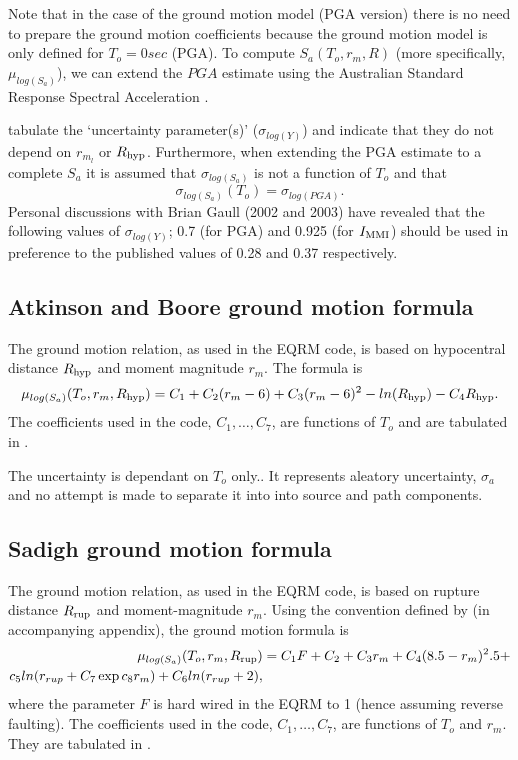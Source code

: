 Note that in the case of the \citet{dr_Gaull90a} ground motion model
(PGA version) there is no need to prepare the ground motion
coefficients because the ground motion model is only defined for
$T_o=0 sec$ (PGA). To compute $S_a(T_o,r_m,R)$ (more specifically,
$\mu_{log(S_a)}$), we can extend the $PGA$ estimate using the
Australian Standard Response Spectral Acceleration
\citep{dr_Standards93a}. 

\citet[Table 4]{dr_Gaull90a} tabulate the `uncertainty
parameter(s)' ($\sigma_{log(Y)}$) and indicate that they do not
depend on $r_{m_l}$ or $\Rhyp$. Furthermore, when extending the
PGA estimate to a complete $S_a$ it is assumed that
$\sigma_{log(S_a)}$ is not a function of $T_o$ and that
\begin{equation}
\sigma_{log(S_a)}(T_o) = \sigma_{log(PGA)}.
\end{equation}
Personal discussions with Brian Gaull (2002 and 2003) have
revealed that the following values of $\sigma_{log(Y)}$; 0.7 (for
PGA) and 0.925 (for $\Imm$) should be used in preference to the
published values of 0.28 and 0.37 respectively.


\subsection{Atkinson and Boore ground motion formula}

The \cite{dr_Atkinson97a} ground motion relation, as used in the
EQRM code, is based on hypocentral distance $\Rhyp$ and moment
magnitude $r_m$. The formula is
\begin{equation}
\mu_{log(S_a)}(T_o,r_m,\Rhyp) = C_1 + C_2(r_m-6) + C_3(r_m-6)^2
-ln(\Rhyp)-C_4\Rhyp.
\end{equation}
The coefficients used in the code, $C_1,\ldots,C_7$, are functions
of $T_o$ and are tabulated in \citet[Table 1]{dr_Atkinson97a}.

The uncertainty is dependant on $T_o$ only.. It represents aleatory uncertainty,
$\sigma_a$ and no attempt is made to separate it into into source
and path components.


\subsection{Sadigh ground motion formula}

The \cite{dr_Sadigh97a} ground motion relation, as used in the EQRM
code, is based on rupture distance $\Rrup$ and moment-magnitude
$r_m$. Using the convention defined by \citet{dr_Campbell03a} (in
accompanying appendix), the ground motion formula is
\begin{equation}
\begin{split}
\mu_{log(S_a)}(T_o,r_m,\Rrup) & = C_1F +C_2 + C_3r_m
+C_4(8.5-r_m)^2.5 + \\ c_5ln(r_{rup}+C_7\exp{c_8r_m}) +
C_6ln(r_{rup}+2),
\end{split}
\end{equation}
where the parameter $F$ is hard wired in the EQRM to 1 (hence
assuming reverse faulting). The coefficients used in the code,
$C_1,\ldots,C_7$, are functions of $T_o$ and $ r_m$. They are
tabulated in \citet[Table 2]{dr_Sadigh97a}.

